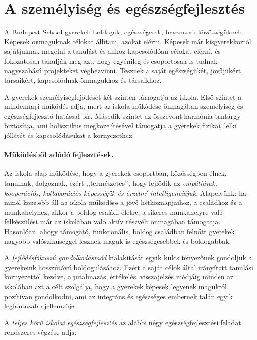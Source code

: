 \section{A személyiség és egészségfejlesztés}
\label{sec:szemilyesegfejlesztes}

A Budapest School gyerekek boldogak, egészségesek, hasznosak közösségüknek. Képesek önmaguknak célokat állítani, azokat elérni. Képesek  már kisgyerekkortól sajátjuknak megélni a tanulást és ahhoz kapcsolódóan célokat elérni, és fokozatosan tanulják meg azt, hogy egyénileg és csoportosan is tudnak nagyszabású projekteket véghezvinni. Tesznek a saját egészségükét, jövőjükért, társaikért, kapcsolódnak önmagukhoz és társaikhoz.

A gyerekek személyiségfejődését két szinten támogatja az iskola. Első szintet a mindennapi működés adja, mert az iskola működése önmagában személyiség és egészségfejlesztő hatással bír. Második szintet az összevont harmónia tantárgy biztosítja, ami holisztikus megközelítésével támogatja a gyerekek fizikai, lelki jóllétét és kapcsolódásukat a
környezethez.

\paragraph{Működésből adódó fejlesztések.}
Az iskola alap működése, hogy a gyerekek csoportban, közösségben élnek, tanulnak, dolgoznak, ezért ,,természetes'', hogy fejlődik az \emph{empátiájuk, kooperációs, kollaborációs képességük és érzelmi intelligenciájuk}. Alapelvünk: ha minél közelebb áll az iskola működése a jövő hétköznapjaihoz, a családhoz és a munkahelyhez, akkor a boldog családi életre, a sikeres munkahelyre való felkészülést már az iskolában való aktív részvélt önmagában támogatja. Hasonlóan, ahogy támogató, funkcionális, boldog családban felnőtt gyerekek nagyobb valószínűséggel lesznek maguk is egészségesebbek és boldogabbak.

A \emph{fejlődésfókuszú gondolkodásmód} kialakítását egyik kulcs tényezőnek gondoljuk a gyerekeink hosszútávú boldogulásához. Ezért a saját célok által irányított tanulási környezettől kezdve, a jutalmazás, értékelés, visszajelzés módjáig minden az iskolában azt a célt szolgálja, hogy a gyerekek képesek legyenek magukról pozítivan gondolkodni, ami az integráns és egészséges embernek talán egyik legfontosabb jellemzője.

A \emph{teljes körű iskolai egészségfejlesztés} az alábbi négy egészségfejlesztési feladat rendszeres végzése adja:

